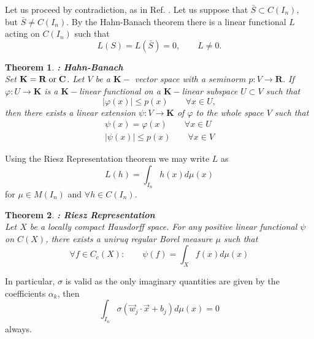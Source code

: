 \documentclass[aps,amssymb,amsmath,amsfonts,pra,superscriptaddress,onecolumn]{revtex4}
\newtheorem{theorem}{Theorem}
\begin{document}
Let us proceed by contradiction, as in Ref. \cite{uat-cybenko1989}. Let us suppose that $\bar S \subset C(I_n)$, but $\bar S \neq C(I_n)$. By the Hahn-Banach theorem there is a linear functional $L$ acting on $C(I_n)$ such that
\begin{equation}
L(S) = L(\bar S) = 0 , \qquad L \neq 0.
\end{equation} 

\begin{theorem}
{\bf: Hahn-Banach} \cite{analysis-hahn1927, analysis-banach1929}\\

Set $\mathbf{K} = \mathbf{R} {\;\rm or\;} \mathbf{C}$. Let $V$ be a $\mathbf{K}-$ vector space with a seminorm $p: V \rightarrow \mathbf{R}$. If $\varphi : U \rightarrow \mathbf{K}$ is a $\mathbf{K}-$linear functional on a $\mathbf{K}-$linear subspace $U\subset V$ such that
\begin{equation}
|\varphi(x)| \leq p(x) \qquad \forall x \in U,
\end{equation}
then there exists a linear extension $\psi : V \rightarrow \mathbf{K}$ of $\varphi$ to the whole space $V$ such that
\begin{eqnarray}
\psi(x) = \varphi(x) \qquad \forall x\in U \\
|\psi(x)| \leq p(x) \qquad \forall x\in V
\end{eqnarray}
\end{theorem}
Using the Riesz Representation theorem we may write $L$ as
\begin{equation}
L(h) = \int_{I_n} h(x) d\mu(x)
\end{equation}
for $\mu\in M(I_n)$ and $\forall h \in C(I_n)$. 
\begin{theorem}
{\bf: Riesz Representation} \cite{analysis-riesz1914}\\

Let $X$ be a locally compact Hausdorff space. For any positive linear functional $\psi$ on $C(X)$, there exists a uniruq regular Borel measure $\mu$ such that
\begin{equation}
\forall f \in C_c(X): \qquad \psi(f) = \int_X f(x) d\mu(x)
\end{equation}
\end{theorem}

In particular, $\sigma$ is valid as the only imaginary quantities are given by the coefficients $\alpha_k$, then
\begin{equation}
\int_{I_n} \sigma(\vec w_j \cdot \vec x + b_j) d\mu(x) = 0
\end{equation}
always. 
\end{document}
